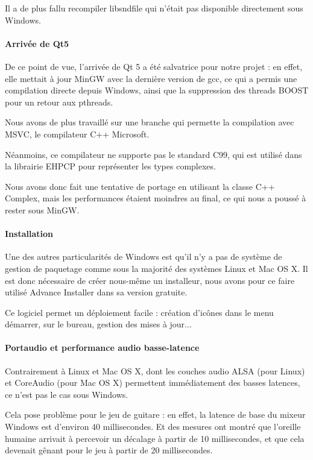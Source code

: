 \documentclass[a4paper,11pt]{article}
\begin{document}
Il a de plus fallu recompiler libsndfile qui n'était pas disponible directement sous Windows.

\paragraph{Arrivée de Qt5}
De ce point de vue, l'arrivée de Qt 5 a été salvatrice pour notre projet : en effet, elle mettait à jour MinGW
avec la dernière version de gcc, ce qui a permis une compilation directe depuis Windows, ainsi que la suppression des
threads BOOST pour un retour aux pthreads.

Nous avons de plus travaillé sur une branche qui permette la compilation avec MSVC, le compilateur C++ Microsoft.

Néanmoins, ce compilateur ne supporte pas le standard C99, qui est utilisé dans la librairie EHPCP pour représenter les types complexes.

Nous avons donc fait une tentative de portage en utilisant la classe C++ Complex, mais les performances étaient moindres au final,
ce qui nous a poussé à rester sous MinGW.

\paragraph{Installation}
Une des autres particularités de Windows est qu'il n'y a pas de système de gestion de paquetage comme sous la majorité des systèmes Linux et Mac OS X.
Il est donc nécessaire de créer nous-même un installeur, nous avons pour ce faire utilisé Advance Installer dans sa version gratuite.

Ce logiciel permet un déploiement facile : création d'icônes dans le menu démarrer, sur le bureau, gestion des mises à jour...

\paragraph{Portaudio et performance audio basse-latence}
Contrairement à Linux et Mac OS X, dont les couches audio ALSA (pour Linux) et CoreAudio (pour Mac OS X) permettent immédiatement
des basses latences, ce n'est pas le cas sous Windows.

Cela pose problème pour le jeu de guitare : en effet, la latence de base du mixeur Windows est d'environ 40 millisecondes.
Et des mesures ont montré que l'oreille humaine arrivait à percevoir un décalage à partir de 10 millisecondes, et que cela devenait gênant pour le jeu à partir de 20 millisecondes.
\end{document}
